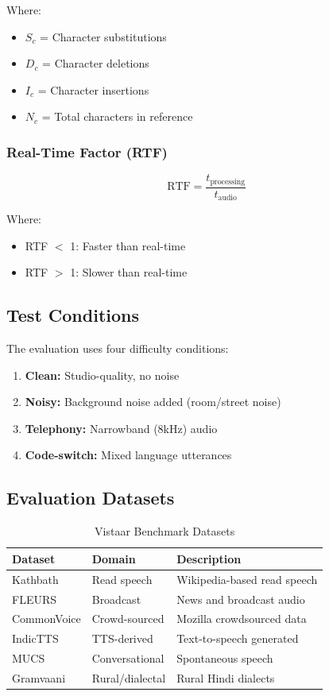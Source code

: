 \documentclass[12pt,a4paper]{article}
\begin{document}
Where:
\begin{itemize}[leftmargin=*]
\item $S_c$ = Character substitutions
\item $D_c$ = Character deletions
\item $I_c$ = Character insertions
\item $N_c$ = Total characters in reference
\end{itemize}

\subsubsection{Real-Time Factor (RTF)}

\begin{equation}
\text{RTF} = \frac{t_{\text{processing}}}{t_{\text{audio}}}
\end{equation}

Where:
\begin{itemize}[leftmargin=*]
\item RTF $<$ 1: Faster than real-time
\item RTF $>$ 1: Slower than real-time
\end{itemize}

\subsection{Test Conditions}

The evaluation uses four difficulty conditions:

\begin{enumerate}[leftmargin=*]
\item \textbf{Clean:} Studio-quality, no noise
\item \textbf{Noisy:} Background noise added (room/street noise)
\item \textbf{Telephony:} Narrowband (8kHz) audio
\item \textbf{Code-switch:} Mixed language utterances
\end{enumerate}

\subsection{Evaluation Datasets}

\begin{table}[h]
\centering
\caption{Vistaar Benchmark Datasets}
\begin{tabular}{@{}lll@{}}
\toprule
\textbf{Dataset} & \textbf{Domain} & \textbf{Description} \\
\midrule
Kathbath & Read speech & Wikipedia-based read speech \\
FLEURS & Broadcast & News and broadcast audio \\
CommonVoice & Crowd-sourced & Mozilla crowdsourced data \\
IndicTTS & TTS-derived & Text-to-speech generated \\
MUCS & Conversational & Spontaneous speech \\
Gramvaani & Rural/dialectal & Rural Hindi dialects \\
\bottomrule
\end{tabular}
\end{table}
\end{document}
